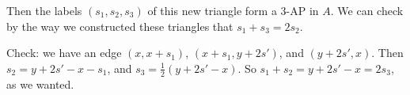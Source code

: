 Then the labels $(s_1,s_2,s_3)$ of this new triangle form a 3-AP in $A$. We can check by the way we constructed these triangles that $s_1+s_3=2s_2$.

Check: we have an edge $(x,x+s_1)$, $(x+s_1,y+2s')$, and $(y+2s',x)$. Then $s_2 = y+2s'- x - s_1$, and $s_3 = \frac{1}{2}(y+2s'-x)$. So $s_1 + s_2 = y+ 2s' - x = 2s_3$, as we wanted.